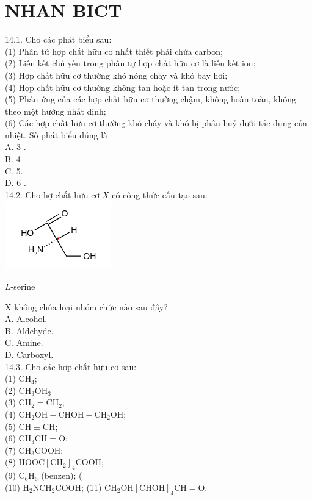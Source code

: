 \documentclass[10pt]{article}
\begin{document}
\section*{NHAN BICT}
14.1. Cho các phát biểu sau:\\
(1) Phân tử hợp chất hữu cơ nhất thiết phải chứa carbon;\\
(2) Liên kết chủ yếu trong phân tự hợp chất hữu cơ là liên kết ion;\\
(3) Hợp chất hữu cơ thường khó nóng chảy và khó bay hơi;\\
(4) Họp chất hữu cơ thường không tan hoặc ít tan trong nước;\\
(5) Phản ứng của các hợp chất hữu cơ thường chậm, không hoàn toàn, không theo một hướng nhất định;\\
(6) Các hợp chất hữu cơ thường khó cháy và khó bị phân huỷ dưới tác dụng của nhiệt. Số phát biểu đúng là\\
A. 3 .\\
B. 4\\
C. 5.\\
D. 6 .\\
14.2. Cho hợ chất hữu cơ $X$ có công thức cấu tạo sau:\\
\includegraphics{smile-b0e6b84729e003375d09c255ac60ff7eaf53bd73}

$L$-serine

X không chúa loại nhóm chức nào sau đây?\\
A. Alcohol.\\
B. Aldehyde.\\
C. Amine.\\
D. Carboxyl.\\
14.3. Cho các hợp chất hữu cơ sau:\\
(1) $\mathrm{CH}_{4}$;\\
(2) $\mathrm{CH}_{3} \mathrm{OH}_{3}$\\
(3) $\mathrm{CH}_{2}=\mathrm{CH}_{2}$;\\
(4) $\mathrm{CH}_{2} \mathrm{OH}-\mathrm{CHOH}-\mathrm{CH}_{2} \mathrm{OH}$;\\
(5) $\mathrm{CH} \equiv \mathrm{CH}$;\\
(6) $\mathrm{CH}_{3} \mathrm{CH}=\mathrm{O}$;\\
(7) $\mathrm{CH}_{3} \mathrm{COOH}$;\\
(8) $\mathrm{HOOC}\left[\mathrm{CH}_{2}\right]_{4} \mathrm{COOH}$;\\
(9) $\mathrm{C}_{6} \mathrm{H}_{6}$ (benzen); (\\
(10) $\mathrm{H}_{2} \mathrm{NCH}_{2} \mathrm{COOH}$; (11) $\mathrm{CH}_{2} \mathrm{OH}[\mathrm{CHOH}]_{4} \mathrm{CH}=\mathrm{O}$.
\end{document}
